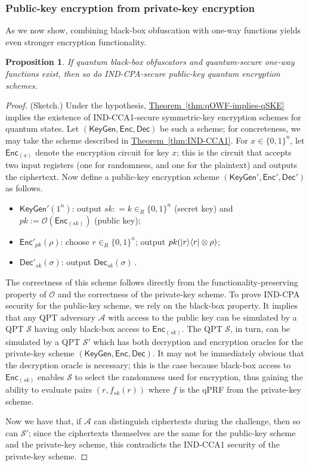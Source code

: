 \documentclass[envcountsame]{llncs}
\numberwithin{equation}{section}
\newtheorem{prop}{Proposition}
\newcommand{\expref}[2]{\texorpdfstring{\hyperref[#2]{#1~\ref{#2}}}{#1~\ref{#2}}}
\newcommand{\algo}{\mathcal}
\newcommand{\KeyGen}{\ensuremath{\mathsf{KeyGen}}\xspace}
\newcommand{\Enc}{\ensuremath{\mathsf{Enc}}\xspace}
\newcommand{\Dec}{\ensuremath{\mathsf{Dec}}\xspace}
\newcommand{\inrand}{\in_R}
\begin{document}
\subsubsection{Public-key encryption from private-key encryption}

As we now show, combining black-box obfuscation with one-way functions yields even stronger encryption functionality.

\begin{prop}\label{prop:PKE}
If quantum black-box obfuscators and quantum-secure one-way functions exist, then so do IND-CPA-secure public-key quantum encryption schemes.
\end{prop}
\begin{proof} (Sketch.)
Under the hypothesis, \expref{Theorem}{thm:qOWF-implies-qSKE} implies the existence of IND-CCA1-secure symmetric-key encryption schemes for quantum states. Let $(\KeyGen, \Enc, \Dec)$ be such a scheme; for concreteness, we may take the scheme described in \expref{Theorem}{thm:IND-CCA1}. For $x \in \{0, 1\}^n$, let $\Enc_{(x)}$ denote the encryption circuit for key $x$; this is the circuit that accepts two input registers (one for randomness, and one for the plaintext) and outputs the ciphertext. Now define a public-key encryption scheme $(\KeyGen', \Enc', \Dec')$ as follows.
\begin{itemize}
\item $\KeyGen'(1^n)$: output $sk : = k \inrand \{0, 1\}^n$ (secret key) and $pk := \algo O\left(\Enc_{(sk)}\right)$ (public key);
\item $\Enc'_{pk}(\rho)$: choose $r \inrand \{0, 1\}^n$; output $pk( {\left\vert{r}\right\rangle}{\left\langle{r}\right\vert} \otimes \rho)$;
\item $\Dec'_{sk}(\sigma)$: output  $\Dec_{sk}(\sigma)$\,.
\end{itemize}
The correctness of this scheme follows directly from the functionality-preserving property of $\algo O$ and the correctness of the private-key scheme. To prove IND-CPA security for the public-key scheme, we rely on the black-box property. It implies that any QPT adversary $\algo A$ with access to the public key can be simulated by a QPT $\algo S$ having only black-box access to $\Enc_{(sk)}$. The QPT $\algo S$, in turn, can be simulated by a QPT $\algo S'$ which has both decryption and encryption oracles for the private-key scheme $(\KeyGen, \Enc, \Dec)$. It may not be immediately obvious that the decryption oracle is necessary; this is the case because black-box access to $\Enc_{(sk)}$ enables $\algo S$ to select the randomness used for encryption, thus gaining the ability to evaluate pairs $(r, f_{sk}(r))$ where $f$ is the qPRF from the private-key scheme. 

Now we have that, if $\algo A$ can distinguish ciphertexts during the challenge, then so can $\algo S'$; since the ciphertexts themselves are the same for the public-key scheme and the private-key scheme, this contradicts the IND-CCA1 security of the private-key scheme.
\end{proof}
\end{document}
